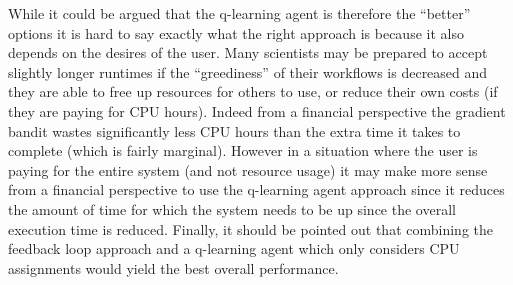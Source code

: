 While it could be argued that the q-learning agent is therefore the “better” options it is hard to say exactly what the right approach is because it also depends on the desires of the user. Many scientists may be prepared to accept slightly longer runtimes if the “greediness” of their workflows is decreased and they are able to free up resources for others to use, or reduce their own costs (if they are paying for CPU hours). Indeed from a financial perspective the gradient bandit wastes significantly less CPU hours than the extra time it takes to complete (which is fairly marginal). However in a situation where the user is paying for the entire system (and not resource usage) it may make more sense from a financial perspective to use the q-learning agent approach since it reduces the amount of time for which the system needs to be up since the overall execution time is reduced. Finally, it should be pointed out that combining the feedback loop approach and a q-learning agent which only considers CPU assignments would yield the best overall performance.